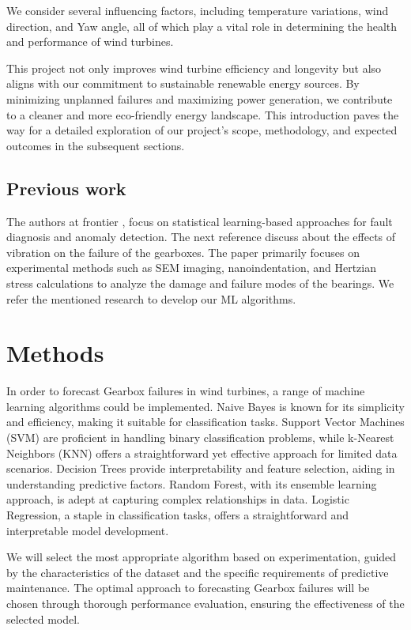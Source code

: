 \documentclass[11pt,a4paper]{article}
\begin{document}
We consider several influencing factors, including temperature variations, wind direction, and Yaw angle, all of which play a vital role in determining the health and performance of wind turbines.

This project not only improves wind turbine efficiency and longevity but also aligns with our commitment to sustainable renewable energy sources. By minimizing unplanned failures and maximizing power generation, we contribute to a cleaner and more eco-friendly energy landscape. This introduction paves the way for a detailed exploration of our project's scope, methodology, and expected outcomes in the subsequent sections.



\subsection*{Previous work} %
The authors at frontier \cite{reference2}, focus on statistical learning-based approaches for fault diagnosis and anomaly detection. The next reference  \cite{reference1} discuss about the effects of vibration on the failure of the gearboxes. The paper \cite{reference3} primarily focuses on experimental methods such as SEM imaging, nanoindentation, and Hertzian stress calculations to analyze the damage and failure modes of the bearings. We refer the mentioned research to develop our ML algorithms.


\section{Methods}
In order to forecast Gearbox failures in wind turbines, a range of machine learning algorithms could be implemented. Naive Bayes is known for its simplicity and efficiency, making it suitable for classification tasks. Support Vector Machines (SVM) are proficient in handling binary classification problems, while k-Nearest Neighbors (KNN) offers a straightforward yet effective approach for limited data scenarios. Decision Trees provide interpretability and feature selection, aiding in understanding predictive factors. Random Forest, with its ensemble learning approach, is adept at capturing complex relationships in data. Logistic Regression, a staple in classification tasks, offers a straightforward and interpretable model development. 

We will select the most appropriate algorithm based on experimentation, guided by the characteristics of the dataset and the specific requirements of predictive maintenance. The optimal approach to forecasting Gearbox failures will be chosen through thorough performance evaluation, ensuring the effectiveness of the selected model.



\end{document}
